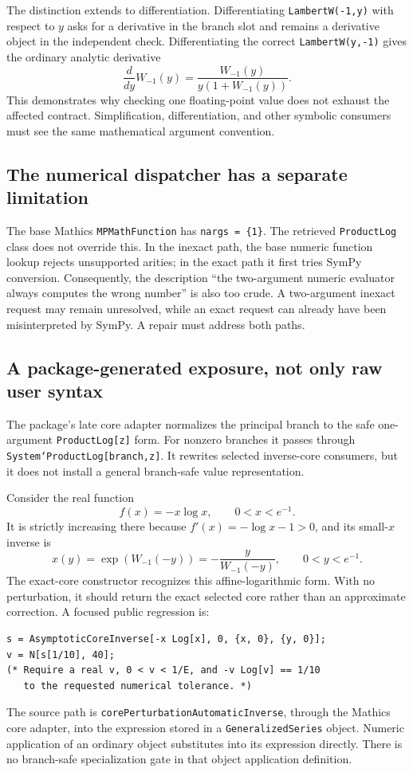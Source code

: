 \documentclass[11pt,letterpaper]{article}
\newcommand{\code}[1]{\texttt{#1}}
\begin{document}
The distinction extends to differentiation. Differentiating \code{LambertW(-1,y)} with respect to $y$ asks for a derivative in the branch slot and remains a derivative object in the independent check. Differentiating the correct \code{LambertW(y,-1)} gives the ordinary analytic derivative
\[
 \frac{d}{dy}W_{-1}(y)=\frac{W_{-1}(y)}{y(1+W_{-1}(y))}.
\]
This demonstrates why checking one floating-point value does not exhaust the affected contract. Simplification, differentiation, and other symbolic consumers must see the same mathematical argument convention.

\subsection{The numerical dispatcher has a separate limitation}

The base Mathics \code{MPMathFunction} has \code{nargs = \{1\}}. The retrieved \code{ProductLog} class does not override this. In the inexact path, the base numeric function lookup rejects unsupported arities; in the exact path it first tries SymPy conversion. Consequently, the description ``the two-argument numeric evaluator always computes the wrong number'' is also too crude. A two-argument inexact request may remain unresolved, while an exact request can already have been misinterpreted by SymPy. A repair must address both paths.~\cite{mathics-productlog,mathics-builtin}

\subsection{A package-generated exposure, not only raw user syntax}

The package's late core adapter normalizes the principal branch to the safe one-argument \code{ProductLog[z]} form. For nonzero branches it passes through \code{System`ProductLog[branch,z]}. It rewrites selected inverse-core consumers, but it does not install a general branch-safe value representation.~\cite{mathics-core}

Consider the real function
\[
 f(x)=-x\log x,\qquad 0<x<e^{-1}.
\]
It is strictly increasing there because $f'(x)=-\log x-1>0$, and its small-$x$ inverse is
\[
 x(y)=\exp(W_{-1}(-y))=-\frac{y}{W_{-1}(-y)},\qquad 0<y<e^{-1}.
\]
The exact-core constructor recognizes this affine-logarithmic form. With no perturbation, it should return the exact selected core rather than an approximate correction. A focused public regression is:
\begin{lstlisting}
s = AsymptoticCoreInverse[-x Log[x], 0, {x, 0}, {y, 0}];
v = N[s[1/10], 40];
(* Require a real v, 0 < v < 1/E, and -v Log[v] == 1/10
   to the requested numerical tolerance. *)
\end{lstlisting}
The source path is \code{corePerturbationAutomaticInverse}, through the Mathics core adapter, into the expression stored in a \code{GeneralizedSeries} object. Numeric application of an ordinary object substitutes into its expression directly. There is no branch-safe specialization gate in that object application definition.~\cite{corepert,mathics-core,core}
\end{document}
